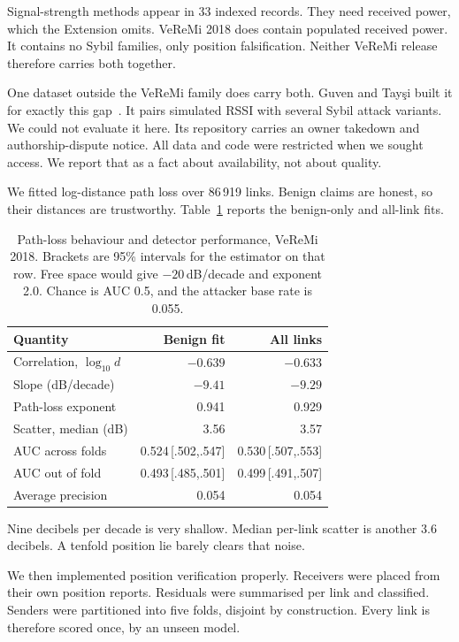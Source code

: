 \documentclass[conference]{IEEEtran}
\begin{document}
Signal-strength methods appear in 33 indexed records.
They need received power, which the Extension omits.
VeReMi 2018 does contain populated received power.
It contains no Sybil families, only position falsification.
Neither VeReMi release therefore carries both together.

One dataset outside the VeReMi family does carry both.
Guven and Tay\c{s}i built it for exactly this gap~\cite{guven2024}.
It pairs simulated RSSI with several Sybil attack variants.
We could not evaluate it here.
Its repository carries an owner takedown and authorship-dispute notice.
All data and code were restricted when we sought access.
We report that as a fact about availability, not about quality.

We fitted log-distance path loss over 86\,919 links.
Benign claims are honest, so their distances are trustworthy.
Table~\ref{tab:pathloss} reports the benign-only and all-link fits.

\begin{table}[t]
\caption{Path-loss behaviour and detector performance, VeReMi 2018.
Brackets are 95\% intervals for the estimator on that row.
Free space would give $-20$\,dB/decade and exponent 2.0.
Chance is AUC 0.5, and the attacker base rate is 0.055.}
\label{tab:pathloss}
\centering
\scriptsize
\begin{tabular}{@{}lrr@{}}
\toprule
Quantity & Benign fit & All links \\
\midrule
Correlation, $\log_{10} d$ & $-0.639$ & $-0.633$ \\
Slope (dB/decade) & $-9.41$ & $-9.29$ \\
Path-loss exponent & 0.941 & 0.929 \\
Scatter, median (dB) & 3.56 & 3.57 \\
\midrule
AUC across folds & 0.524\,[.502,.547] & 0.530\,[.507,.553] \\
AUC out of fold & 0.493\,[.485,.501] & 0.499\,[.491,.507] \\
Average precision & 0.054 & 0.054 \\
\bottomrule
\end{tabular}
\end{table}

Nine decibels per decade is very shallow.
Median per-link scatter is another 3.6 decibels.
A tenfold position lie barely clears that noise.

We then implemented position verification properly.
Receivers were placed from their own position reports.
Residuals were summarised per link and classified.
Senders were partitioned into five folds, disjoint by construction.
Every link is therefore scored once, by an unseen model.
\end{document}
